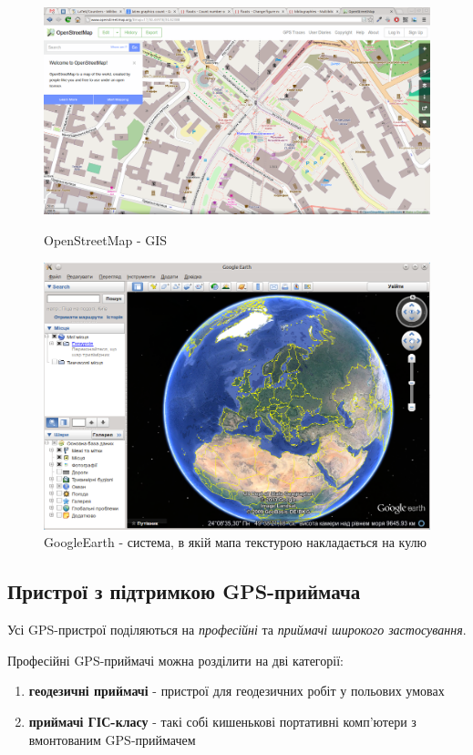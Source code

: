 \documentclass[simple,a4paper,14pt,ukrainian,utf8]{eskdtext}
\begin{document}
	\vspace{2em}
	\begin{figure}
		\centering \includegraphics[scale=0.35]{images/osm.png}
		\caption{OpenStreetMap - GIS}
	
		\centering \includegraphics[scale=0.45]{images/google_earth.png}
		\caption{GoogleEarth - система, в якій мапа текстурою накладається на кулю}
	\end{figure}

    \subsection{Пристрої з підтримкою GPS-приймача}
    
    Усі GPS-пристрої поділяються на \textit{професійні} та \textit{приймачі широкого застосування}.
	
	Професійні GPS-приймачі можна розділити на дві категорії:
    
    \begin{enumerate}
    	\item \textbf{геодезичні приймачі} - пристрої для геодезичних робіт у польових умовах
    	\item \textbf{приймачі ГІС-класу} - такі собі кишенькові портативні комп’ютери з вмонтованим GPS-приймачем
    \end{enumerate}
    
\end{document}
